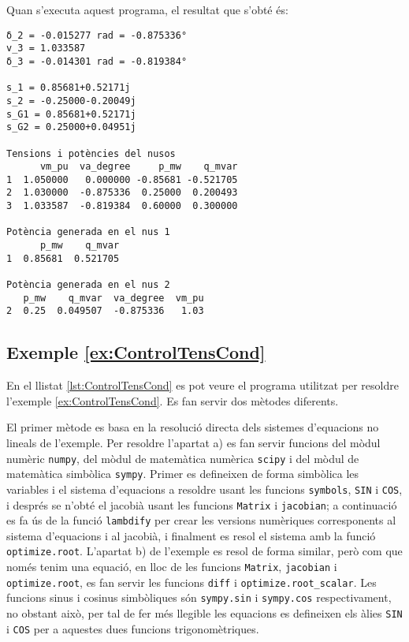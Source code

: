 Quan s'executa aquest programa, el resultat que s'obté és:
\lstset{
	language=,
	numbers=none,
	frame=none
}
\begin{lstlisting}
δ_2 = -0.015277 rad = -0.875336°
v_3 = 1.033587
δ_3 = -0.014301 rad = -0.819384°

s_1 = 0.85681+0.52171j
s_2 = -0.25000-0.20049j
s_G1 = 0.85681+0.52171j
s_G2 = 0.25000+0.04951j

Tensions i potències del nusos
      vm_pu  va_degree     p_mw    q_mvar
1  1.050000   0.000000 -0.85681 -0.521705
2  1.030000  -0.875336  0.25000  0.200493
3  1.033587  -0.819384  0.60000  0.300000

Potència generada en el nus 1
      p_mw    q_mvar
1  0.85681  0.521705

Potència generada en el nus 2
   p_mw    q_mvar  va_degree  vm_pu
2  0.25  0.049507  -0.875336   1.03
\end{lstlisting} 


\hypertarget{exemple:ControlTensCond}{\subsection{Exemple \ref*{ex:ControlTensCond} \ControlTensCond}}
En el llistat \vref{lst:ControlTensCond} es pot veure el programa utilitzat per resoldre l'exemple \vref{ex:ControlTensCond}. Es fan servir dos mètodes diferents.

El primer mètode es basa en la resolució directa dels sistemes d'equacions no lineals de l'exemple. Per resoldre l'apartat a)   es fan servir funcions del mòdul numèric \texttt{numpy}, del mòdul de matemàtica numèrica \texttt{scipy} i del mòdul de matemàtica simbòlica \texttt{sympy}. Primer es defineixen de forma simbòlica les variables i el sistema d'equacions a resoldre usant les funcions \texttt{symbols}, \texttt{SIN} i \texttt{COS}, i després se n'obté el jacobià usant les funcions \texttt{Matrix} i \texttt{jacobian}; a continuació es fa ús de la funció  \texttt{lambdify} per crear les versions numèriques corresponents al sistema d'equacions i al jacobià, i finalment es resol el sistema amb la funció \texttt{optimize.root}. L'apartat b) de l'exemple es resol de forma similar, però com que només tenim una equació, en lloc de les funcions \texttt{Matrix}, \texttt{jacobian} i \texttt{optimize.root}, es fan servir les funcions \texttt{diff} i \texttt{optimize.root\_scalar}. Les funcions sinus i cosinus simbòliques són  \texttt{sympy.sin} i  \texttt{sympy.cos} respectivament, no obstant això,  per tal de fer més llegible les equacions es defineixen els àlies \texttt{SIN} i \texttt{COS} per a aquestes dues funcions trigonomètriques.

